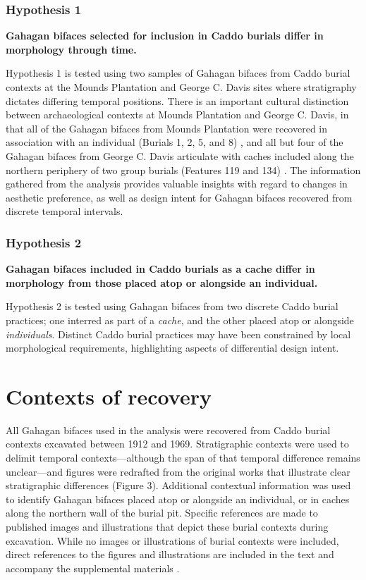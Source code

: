 \documentclass[]{interact}
\theoremstyle{plain}%
\theoremstyle{definition}
\theoremstyle{remark}
\begin{document}
\hypertarget{hypothesis-1}{%
\subsubsection{Hypothesis 1}\label{hypothesis-1}}

\textbf{Gahagan bifaces selected for inclusion in Caddo burials differ
in morphology through time.}

Hypothesis 1 is tested using two samples of Gahagan bifaces from Caddo
burial contexts at the Mounds Plantation and George C. Davis sites where
stratigraphy dictates differing temporal positions. There is an
important cultural distinction between archaeological contexts at Mounds
Plantation and George C. Davis, in that all of the Gahagan bifaces from
Mounds Plantation were recovered in association with an individual
(Burials 1, 2, 5, and 8) \citep{RN8174}, and all but four of the Gahagan
bifaces from George C. Davis articulate with caches included along the
northern periphery of two group burials (Features 119 and 134)
\citep{RN5746,RN8186}. The information gathered from the analysis
provides valuable insights with regard to changes in aesthetic
preference, as well as design intent for Gahagan bifaces recovered from
discrete temporal intervals.

\hypertarget{hypothesis-2}{%
\subsubsection{Hypothesis 2}\label{hypothesis-2}}

\textbf{Gahagan bifaces included in Caddo burials as a cache differ in
morphology from those placed atop or alongside an individual.}

Hypothesis 2 is tested using Gahagan bifaces from two discrete Caddo
burial practices; one interred as part of a \emph{cache}, and the other
placed atop or alongside \emph{individuals}. Distinct Caddo burial
practices may have been constrained by local morphological requirements,
highlighting aspects of differential design intent.

\hypertarget{contexts-of-recovery}{%
\section{Contexts of recovery}\label{contexts-of-recovery}}

All Gahagan bifaces used in the analysis were recovered from Caddo
burial contexts excavated between 1912 and 1969. Stratigraphic contexts
were used to delimit temporal contexts---although the span of that
temporal difference remains unclear---and figures were redrafted from
the original works that illustrate clear stratigraphic differences
(Figure 3). Additional contextual information was used to identify
Gahagan bifaces placed atop or alongside an individual, or in caches
along the northern wall of the burial pit. Specific references are made
to published images and illustrations that depict these burial contexts
during excavation. While no images or illustrations of burial contexts
were included, direct references to the figures and illustrations are
included in the text and accompany the supplemental materials
\citep{RN11065}.
\end{document}
